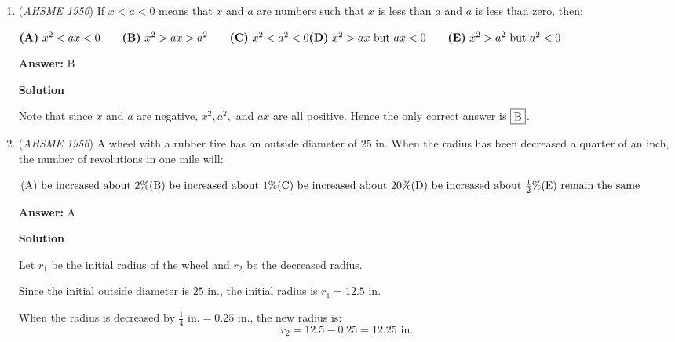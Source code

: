 \begin{enumerate}
We can write all possible triangles adding up to 12 or less
 \[(2, 4, 5)=11\]
 \[(3, 4, 5)=12\]
 \[(2, 3, 4)=9\]

 This leaves $\boxed{\textbf{(C)} \quad 3}$ scalene triangles.

 -coolmath34

 -rubslul

 (If you see any cases I missed out, edit them in.)

 


	\item (\textit{AHSME 1956}) If $x < a < 0$ means that $x$ and $a$ are numbers such that $x$ is less than $a$ and $a$ is less than zero, then: 


 $\textbf{(A)}\ x^2 < ax < 0 \qquad \textbf{(B)}\ x^2 > ax > a^2 \qquad \textbf{(C)}\ x^2 < a^2 < 0 \\ \textbf{(D)}\ x^2 > ax\text{ but }ax < 0 \qquad \textbf{(E)}\ x^2 > a^2\text{ but }a^2 < 0$

 \textbf{Answer: }B



\textbf{Solution}

Note that since $x$ and $a$ are negative, $x^2, a^2,$ and $ax$ are all positive. Hence the only correct answer is $\fbox{B}$.

 


	\item (\textit{AHSME 1956}) A wheel with a rubber tire has an outside diameter of $25$ in. 
When the radius has been decreased a quarter of an inch, the number of revolutions in one mile will: 


 $\text{(A)}\ \text{be increased about }2\% \qquad \\ \text{(B)}\ \text{be increased about }1\%  \\ \text{(C)}\ \text{be increased about }20\%\qquad \\ \text{(D)}\ \text{be increased about }\frac{1}{2}\%\qquad \\ \text{(E)}\ \text{remain the same}$

 \textbf{Answer: }A



\textbf{Solution}

Let $r_1$ be the initial radius of the wheel and $r_2$ be the decreased radius.

 Since the initial outside diameter is $25\text{ in.}$, the initial radius is $r_1 = 12.5\text{ in.}$

 When the radius is decreased by $\frac{1}{4}\text{ in.} = 0.25\text{ in.}$, the new radius is:
 \[r_2 = 12.5 - 0.25 = 12.25\text{ in.}\]


\end{enumerate}

